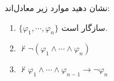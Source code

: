 نشان دهید موارد زیر معادل‌اند:
\begin{enumerate}[label=(\alph*)]
    \item
    $\{\varphi_1,\cdots,\varphi_n\}$
    سازگار است.
    \item $\not\vdash\neg(\varphi_1\wedge\cdots\wedge\varphi_n)$
    \item $\not\vdash\varphi_1\wedge\cdots\wedge\varphi_{n-1}\to\neg\varphi_n$
\end{enumerate}
